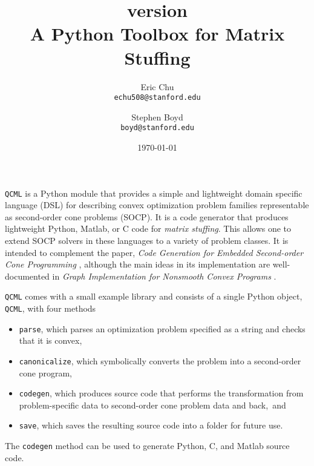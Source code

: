 \documentclass[11pt]{article}
\title{\qcml version \qcmlver \\
A Python Toolbox for Matrix Stuffing}
\author{
Eric Chu\\\texttt{echu508@stanford.edu}
\and
Stephen Boyd\\\texttt{boyd@stanford.edu}
}
\date{\today}
\def\qcml{\texttt{QCML}\xspace}
\begin{document}
  \maketitle

\qcml is a Python module that provides a simple and lightweight domain
specific language (DSL) for describing convex optimization problem families
representable as second-order cone problems (SOCP). It is a code generator
that produces lightweight Python, Matlab, or C code for \emph{matrix
stuffing}. This allows one to extend SOCP solvers in these languages to a
variety of problem classes. It is intended to complement the paper,
\emph{Code Generation for Embedded Second-order Cone Programming} \cite{CPD:13},
although the main ideas in its
implementation are well-documented in \emph{Graph Implementation for Nonsmooth Convex Programs}
\cite{GB:08}.

\qcml comes with a small example library and consists of a single Python
object, \texttt{QCML}, with four methods
\begin{itemize}
\item {\tt parse}, which parses an optimization problem specified as a
string and checks that it is convex,
\item {\tt canonicalize}, which symbolically converts the problem into
a second-order cone program,
\item {\tt codegen}, which produces source code that performs the
transformation from problem-specific data to second-order cone problem data
and back,~and
\item {\tt save}, which saves the resulting source code into a folder for
future use.
\end{itemize}
The \texttt{codegen} method can be used to generate Python, C, and Matlab
source code.
\end{document}
